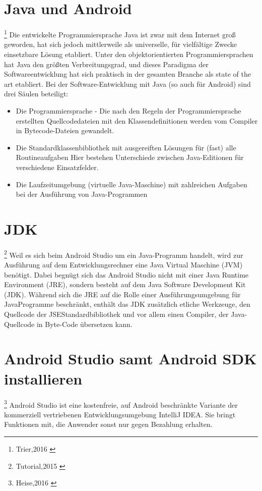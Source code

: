 \section{Java und Android}
\footnote{Trier,2016 \cite{Trier2016}}
Die entwickelte
Programmiersprache Java ist zwar mit dem Internet groß geworden, hat sich jedoch mittlerweile
als universelle, für vielfältige Zwecke einsetzbare Lösung etabliert. Unter den objektorientierten
Programmiersprachen hat Java den größten Verbreitungsgrad, und dieses Paradigma der Softwareentwicklung
hat sich praktisch in der gesamten Branche als state of the art etabliert.
Bei der Software-Entwicklung mit Java (so auch für Android) sind drei Säulen beteiligt:
\begin{itemize}
\item Die Programmiersprache - Die nach den Regeln der Programmiersprache erstellten Quellcodedateien mit den Klassendefinitionen
werden vom Compiler in Bytecode-Dateien gewandelt.
\item Die Standardklassenbibliothek mit ausgereiften Lösungen für (fast) alle Routineaufgaben
Hier bestehen Unterschiede zwischen Java-Editionen für verschiedene Einsatzfelder.
\item Die Laufzeitumgebung (virtuelle Java-Maschine) mit zahlreichen Aufgaben bei der Ausführung
von Java-Programmen
\end{itemize}

\section{JDK}
\footnote{Tutorial,2015 \cite{Tutorial2015}}
Weil es sich beim Android Studio um ein Java-Programm handelt, wird zur Ausführung auf dem
Entwicklungsrechner eine Java Virtual Maschine (JVM) benötigt. Dabei begnügt sich das Android
Studio nicht mit einer Java Runtime Environment (JRE), sondern besteht auf dem Java Software
Development Kit (JDK). Während sich die JRE auf die Rolle einer Ausführungsumgebung für JavaProgramme
beschränkt, enthält das JDK zusätzlich etliche Werkzeuge, den Quellcode der JSEStandardbibliothek
und vor allem einen Compiler, der Java-Quellcode in Byte-Code übersetzen
kann.

\section{Android Studio samt Android SDK installieren}
\footnote{Heise,2016 \cite{Heise2016}}
Android Studio ist eine kostenfreie, auf Android beschränkte Variante der kommerziell vertriebenen Entwicklungsumgebung IntelliJ IDEA. Sie bringt Funktionen mit, die Anwender sonst nur gegen Bezahlung erhalten.


